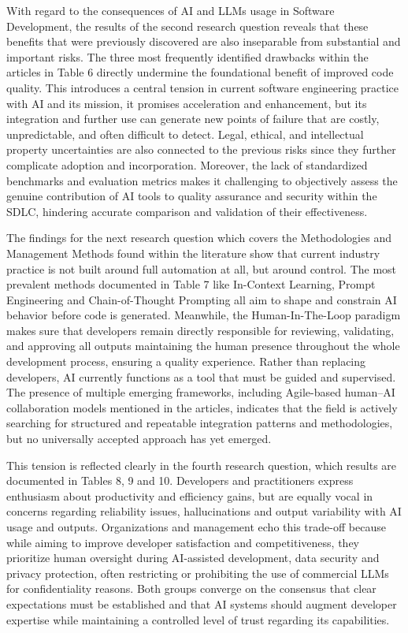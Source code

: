 With regard to the consequences of AI and LLMs usage in Software Development, the results of the second research question reveals that these benefits that were previously discovered are also inseparable from substantial and important risks. The three most frequently identified drawbacks within the articles in Table 6 directly undermine the foundational benefit of improved code quality. This introduces a central tension in current software engineering practice with AI and its mission, it promises acceleration and enhancement, but its integration and further use can generate new points of failure that are costly, unpredictable, and often difficult to detect. Legal, ethical, and intellectual property uncertainties are also connected to the previous risks since they further complicate adoption and incorporation. Moreover, the lack of standardized benchmarks and evaluation metrics makes it challenging to objectively assess the genuine contribution of AI tools to quality assurance and security within the SDLC, hindering accurate comparison and validation of their effectiveness. 

The findings for the next research question which covers the Methodologies and Management Methods found within the literature show that current industry practice is not built around full automation at all, but around control. The most prevalent methods documented in Table 7 like In-Context Learning, Prompt Engineering and Chain-of-Thought Prompting all aim to shape and constrain AI behavior before code is generated. Meanwhile, the Human-In-The-Loop paradigm makes sure that developers remain directly responsible for reviewing, validating, and approving all outputs maintaining the human presence throughout the whole development process, ensuring a quality experience. Rather than replacing developers, AI currently functions as a tool that must be guided and supervised. The presence of multiple emerging frameworks, including Agile-based human–AI collaboration models mentioned in the articles, indicates that the field is actively searching for structured and repeatable integration patterns and methodologies, but no universally accepted approach has yet emerged.

This tension is reflected clearly in the fourth research question, which results are documented in Tables 8, 9 and 10. Developers and practitioners express enthusiasm about productivity and efficiency gains, but are equally vocal in concerns regarding reliability issues, hallucinations and output variability with AI usage and outputs. Organizations and management echo this trade-off because while aiming to improve developer satisfaction and competitiveness, they prioritize human oversight during AI-assisted development, data security and privacy protection, often restricting or prohibiting the use of commercial LLMs for confidentiality reasons. Both groups converge on the consensus that clear expectations must be established and that AI systems should augment developer expertise while maintaining a controlled level of trust regarding its capabilities.

